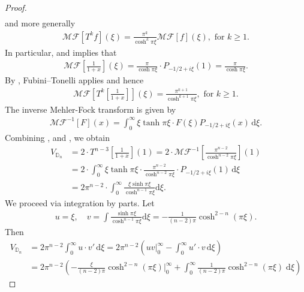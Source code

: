 \documentclass{amsart}
\newcommand{\DD}{\mathbb{D}}
\theoremstyle{definition}
\begin{document}
\begin{proof}
\begin{equation}
\begin{split}
\end{split}
\end{equation}
and more generally
\begin{align*}
    \mathcal{MF}[T^kf](\xi) = \frac{\pi^k}{\cosh^k \pi\xi} \mathcal{MF}[f](\xi),
    \text{ for $k\geqslant 1$.}
\end{align*}
In particular,  and \cite[Equation~7.3.13]{MR350075} implies that 
\begin{align*}
    \mathcal{MF}\left[\frac{1}{1+x}\right](\xi) = \frac{\pi}{\cosh \pi \xi} \cdot P_{-1/2+i\xi}(1) = \frac{\pi}{\cosh \pi \xi}.
\end{align*}
By , Fubini--Tonelli applies and hence
\begin{align}
\label{eq:MF-of-iterates-of-f}    \mathcal{MF}\left[T^{k}\left[\frac{1}{1+x}\right]\right](\xi) = \frac{\pi^{k+1}}{\cosh^{k+1}\pi\xi},
\text{ for $k\geqslant 1$.}\end{align}
 The inverse Mehler-Fock transform is given by \cite[Equation~1.9.11]{MR2254107}
\begin{align}
\label{eq:MF-inverse}
    \mathcal{MF}^{-1}[F](x) = \int_0^\infty \xi \tanh\pi\xi \cdot F(\xi)P_{-1/2+i\xi}(x)\,\mathrm{d}\xi.
\end{align}
Combining ,  and , we obtain  
\begin{equation}
\begin{split}
V_{\DD_{n}} &= 2 \cdot T^{n-3}\left[\frac{1}{1+x}\right](1) = 2\cdot \mathcal{MF}^{-1}\left[\frac{\pi^{n-2}}{\cosh^{n-2}\pi\xi}\right](1)
\\& 
= 2 \cdot \int_0^\infty \xi \tanh\pi\xi  \cdot \frac{\pi^{n-2}}{\cosh^{n-2}\pi\xi} \cdot P_{-1/2+i\xi}(1)\,\mathrm{d}\xi 
\\&
= 2\pi^{n-2}\cdot \int_0^\infty  \frac{\xi \sinh\pi\xi}{\cosh^{n-1}\pi\xi}\mathrm{d}\xi.
\end{split}
\end{equation}
We proceed via integration by parts. Let 
\begin{align*}
u = \xi,\quad v = \int \frac{ \sinh\pi\xi}{\cosh^{n-1}\pi\xi}\mathrm{d}\xi = -\frac{1}{(n-2)\pi}\cosh^{2-n}(\pi\xi).
\end{align*}
Then
\begin{align*}
V_{\DD_{n}} &=   2\pi^{n-2} \int_0^\infty u\cdot v'\, \mathrm{d}\xi = 2\pi^{n-2} \left( u v\Big|_{0}^\infty -\int_0^\infty u'\cdot v\,\mathrm{d}\xi\right)
\\& = 2\pi^{n-2} \left(- \frac{\xi}{(n-2)\pi}\cosh^{2-n}(\pi\xi)\Big|_{0}^\infty +\int_0^\infty  \frac{1}{(n-2)\pi}\cosh^{2-n}(\pi\xi)\; \mathrm{d}\xi \right)

\end{align*}
\end{proof}
\end{document}
